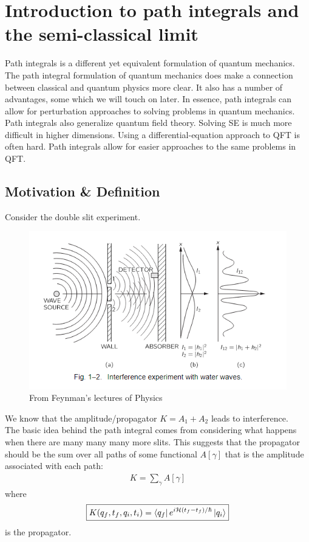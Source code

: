 \documentclass{book}
\theoremstyle{definition}
\newcommand{\had}{\mathcal{H}}
\begin{document}
\newpage

\section{Introduction to path integrals and the semi-classical limit}

Path integrals is a different yet equivalent formulation of quantum mechanics. The path integral formulation of quantum mechanics does make a connection between classical and quantum physics more clear. It also has a number of advantages, some which we will touch on later. In essence, path integrals can allow for perturbation approaches to solving problems in quantum mechanics. Path integrals also generalize quantum field theory. Solving SE is much more difficult in higher dimensions. Using a differential-equation approach to QFT is often hard. Path integrals allow for easier approaches to the same problems in QFT. \\


\subsection{Motivation \& Definition}

Consider the double slit experiment. 
\begin{figure}[!htb]
	\centering
	\includegraphics[scale=0.8]{double-slit}
	\caption{From Feynman's lectures of Physics}
\end{figure}

We know that the amplitude/propagator $K = A_1 + A_2$ leads to interference. \\

The basic idea behind the path integral comes from considering what happens when there are many many many more slits. This suggests that the propagator should be the sum over all paths of some functional $A[\gamma]$ that is the amplitude associated with each path:
\begin{align}
K =\sum_\gamma A[\gamma]
\end{align}
where 
\begin{align}
\boxed{K(q_f,t_f, q_i,t_i) = \bra{q_f} e^{i\had (t_f - t_f)/\hbar} \ket{q_i}}
\end{align}
is the propagator. \\
\end{document}
